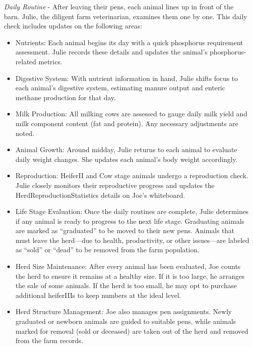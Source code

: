 \documentclass{article}
\begin{document}
\textit{Daily Routine} - After leaving their pens, each animal lines up in front of the barn. Julie, the diligent farm veterinarian, examines them one by one. This daily check includes updates on the following areas:
\begin{itemize}
    \item Nutrients: Each animal begins its day with a quick phosphorus requirement assessment. Julie records these details and updates the animal’s phosphorus-related metrics.
    \item Digestive System: With nutrient information in hand, Julie shifts focus to each animal’s digestive system, estimating manure output and enteric methane production for that day.

    \item Milk Production: All milking cows are assessed to gauge daily milk yield and milk component content (fat and protein). Any necessary adjustments are noted.

    \item Animal Growth: Around midday, Julie returns to each animal to evaluate daily weight changes. She updates each animal’s body weight accordingly.

    \item Reproduction: HeiferII and Cow stage animals undergo a reproduction check. Julie closely monitors their reproductive progress and updates the HerdReproductionStatistics details on Joe’s whiteboard.

    \item Life Stage Evaluation: Once the daily routines are complete, Julie determines if any animal is ready to progress to the next life stage. Graduating animals are marked as “graduated” to be moved to their new pens. Animals that must leave the herd—due to health, productivity, or other issues—are labeled as “sold” or “dead” to be removed from the farm population.

    \item Herd Size Maintenance: After every animal has been evaluated, Joe counts the herd to ensure it remains at a healthy size. If it is too large, he arranges the sale of some animals. If the herd is too small, he may opt to purchase additional heiferIIIs to keep numbers at the ideal level.

    \item Herd Structure Management: Joe also manages pen assignments. Newly graduated or newborn animals are guided to suitable pens, while animals marked for removal (sold or deceased) are taken out of the herd and removed from the farm records.
\end{itemize}
\end{document}

